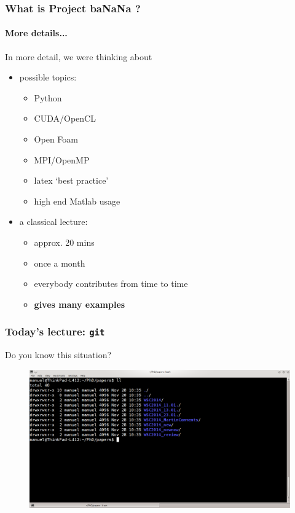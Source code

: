 \documentclass{beamer}
\begin{document}
\begin{frame}
\frametitle{What is Project baNaNa ?}
\framesubtitle{More details...}
In more detail, we were thinking about
\begin{itemize}
 \item possible topics:
 \begin{itemize}
 \item Python
 \item CUDA/OpenCL
 \item Open Foam
 \item MPI/OpenMP
 \item latex `best practice'
 \item high end Matlab usage
 \end{itemize}
 \item a classical lecture:
  \begin{itemize}
 \item approx. 20 mins
 \item once a month
 \item everybody contributes from time to time
 \item \textbf{gives many examples}
 \end{itemize}
\end{itemize}
\end{frame}
\begin{frame}
\frametitle{Today's lecture: \texttt{git}}
Do you know this situation?
\begin{figure}
\centering
 \includegraphics[height=0.6\textheight]{images/screnshot1.png}
\end{figure}
\end{frame}
\end{document}
